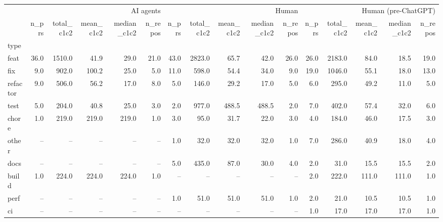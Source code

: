 \begin{tabular}{lrrrrrrrrrrrrrrr}
\toprule
 & \multicolumn{5}{r}{AI agents} & \multicolumn{5}{r}{Human} & \multicolumn{5}{r}{Human (pre-ChatGPT)} \\
 & n_prs & total_c1c2 & mean_c1c2 & median_c1c2 & n_repos & n_prs & total_c1c2 & mean_c1c2 & median_c1c2 & n_repos & n_prs & total_c1c2 & mean_c1c2 & median_c1c2 & n_repos \\
type &  &  &  &  &  &  &  &  &  &  &  &  &  &  &  \\
\midrule
feat & 36.0 & 1510.0 & 41.9 & 29.0 & 21.0 & 43.0 & 2823.0 & 65.7 & 42.0 & 26.0 & 26.0 & 2183.0 & 84.0 & 18.5 & 19.0 \\
fix & 9.0 & 902.0 & 100.2 & 25.0 & 5.0 & 11.0 & 598.0 & 54.4 & 34.0 & 9.0 & 19.0 & 1046.0 & 55.1 & 18.0 & 13.0 \\
refactor & 9.0 & 506.0 & 56.2 & 17.0 & 8.0 & 5.0 & 146.0 & 29.2 & 17.0 & 5.0 & 6.0 & 295.0 & 49.2 & 11.0 & 5.0 \\
test & 5.0 & 204.0 & 40.8 & 25.0 & 3.0 & 2.0 & 977.0 & 488.5 & 488.5 & 2.0 & 7.0 & 402.0 & 57.4 & 32.0 & 6.0 \\
chore & 1.0 & 219.0 & 219.0 & 219.0 & 1.0 & 3.0 & 95.0 & 31.7 & 22.0 & 3.0 & 4.0 & 184.0 & 46.0 & 17.5 & 3.0 \\
other & -- & -- & -- & -- & -- & 1.0 & 32.0 & 32.0 & 32.0 & 1.0 & 7.0 & 286.0 & 40.9 & 18.0 & 4.0 \\
docs & -- & -- & -- & -- & -- & 5.0 & 435.0 & 87.0 & 30.0 & 4.0 & 2.0 & 31.0 & 15.5 & 15.5 & 2.0 \\
build & 1.0 & 224.0 & 224.0 & 224.0 & 1.0 & -- & -- & -- & -- & -- & 2.0 & 222.0 & 111.0 & 111.0 & 1.0 \\
perf & -- & -- & -- & -- & -- & 1.0 & 51.0 & 51.0 & 51.0 & 1.0 & 2.0 & 21.0 & 10.5 & 10.5 & 1.0 \\
ci & -- & -- & -- & -- & -- & -- & -- & -- & -- & -- & 1.0 & 17.0 & 17.0 & 17.0 & 1.0 \\
\bottomrule
\end{tabular}
